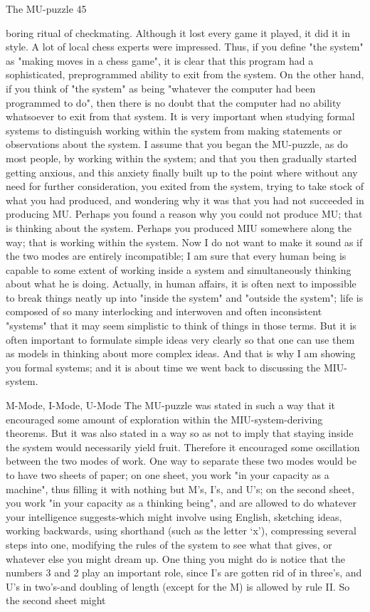 The MU-puzzle                                                                            45

boring ritual of checkmating. Although it lost every game it played, it did it in style. A lot
of local chess experts were impressed. Thus, if you define "the system" as "making
moves in a chess game", it is clear that this program had a sophisticated, preprogrammed
ability to exit from the system. On the other hand, if you think of "the system" as being
"whatever the computer had been programmed to do", then there is no doubt that the
computer had no ability whatsoever to exit from that system.
        It is very important when studying formal systems to distinguish working within
the system from making statements or observations about the system. I assume that you
began the MU-puzzle, as do most people, by working within the system; and that you
then gradually started getting anxious, and this anxiety finally built up to the point where
without any need for further consideration, you exited from the system, trying to take
stock of what you had produced, and wondering why it was that you had not succeeded in
producing MU. Perhaps you found a reason why you could not produce MU; that is
thinking about the system. Perhaps you produced MIU somewhere along the way; that is
working within the system. Now I do not want to make it sound as if the two modes are
entirely incompatible; I am sure that every human being is capable to some extent of
working inside a system and simultaneously thinking about what he is doing. Actually, in
human affairs, it is often next to impossible to break things neatly up into "inside the
system" and "outside the system"; life is composed of so many interlocking and
interwoven and often inconsistent "systems" that it may seem simplistic to think of things
in those terms. But it is often important to formulate simple ideas very clearly so that one
can use them as models in thinking about more complex ideas. And that is why I am
showing you formal systems; and it is about time we went back to discussing the MIU-
system.


                             M-Mode, I-Mode, U-Mode
The MU-puzzle was stated in such a way that it encouraged some amount of exploration
within the MIU-system-deriving theorems. But it was also stated in a way so as not to
imply that staying inside the system would necessarily yield fruit. Therefore it
encouraged some oscillation between the two modes of work. One way to separate these
two modes would be to have two sheets of paper; on one sheet, you work "in your
capacity as a machine", thus filling it with nothing but M's, I's, and U's; on the second
sheet, you work "in your capacity as a thinking being", and are allowed to do whatever
your intelligence suggests-which might involve using English, sketching ideas, working
backwards, using shorthand (such as the letter `x'), compressing several steps into one,
modifying the rules of the system to see what that gives, or whatever else you might
dream up. One thing you might do is notice that the numbers 3 and 2 play an important
role, since I's are gotten rid of in three's, and U's in two's-and doubling of length (except
for the M) is allowed by rule II. So the second sheet might




